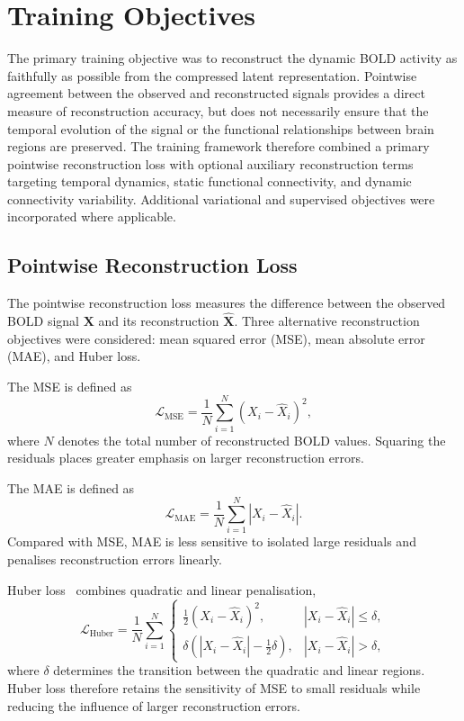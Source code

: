 \section{Training Objectives}

The primary training objective was to reconstruct the dynamic BOLD activity
as faithfully as possible from the compressed latent representation.
Pointwise agreement between the observed and reconstructed signals provides
a direct measure of reconstruction accuracy, but does not necessarily ensure
that the temporal evolution of the signal or the functional relationships
between brain regions are preserved. The training framework therefore
combined a primary pointwise reconstruction loss with optional auxiliary
reconstruction terms targeting temporal dynamics, static functional
connectivity, and dynamic connectivity variability. Additional variational
and supervised objectives were incorporated where applicable.

\subsection{Pointwise Reconstruction Loss}

The pointwise reconstruction loss measures the difference between the
observed BOLD signal $\mathbf{X}$ and its reconstruction
$\hat{\mathbf{X}}$. Three alternative reconstruction objectives were
considered: mean squared error (MSE), mean absolute error (MAE), and Huber
loss.

The MSE is defined as
\begin{equation}
    \mathcal{L}_{\mathrm{MSE}}
    =
    \frac{1}{N}
    \sum_{i=1}^{N}
    \left(
        X_i-\hat{X}_i
    \right)^2,
\end{equation}
where $N$ denotes the total number of reconstructed BOLD values. Squaring
the residuals places greater emphasis on larger reconstruction errors.

The MAE is defined as
\begin{equation}
    \mathcal{L}_{\mathrm{MAE}}
    =
    \frac{1}{N}
    \sum_{i=1}^{N}
    \left|
        X_i-\hat{X}_i
    \right|.
\end{equation}
Compared with MSE, MAE is less sensitive to isolated large residuals and
penalises reconstruction errors linearly.

Huber loss~\cite{Huber1964} combines quadratic and linear penalisation,
\begin{equation}
    \mathcal{L}_{\mathrm{Huber}}
    =
    \frac{1}{N}
    \sum_{i=1}^{N}
    \begin{cases}
        \frac{1}{2}(X_i-\hat{X}_i)^2,
        & |X_i-\hat{X}_i| \leq \delta, \\[4pt]
        \delta
        \left(
            |X_i-\hat{X}_i|-\frac{1}{2}\delta
        \right),
        & |X_i-\hat{X}_i| > \delta,
    \end{cases}
\end{equation}
where $\delta$ determines the transition between the quadratic and linear
regions. Huber loss therefore retains the sensitivity of MSE to small
residuals while reducing the influence of larger reconstruction errors.

